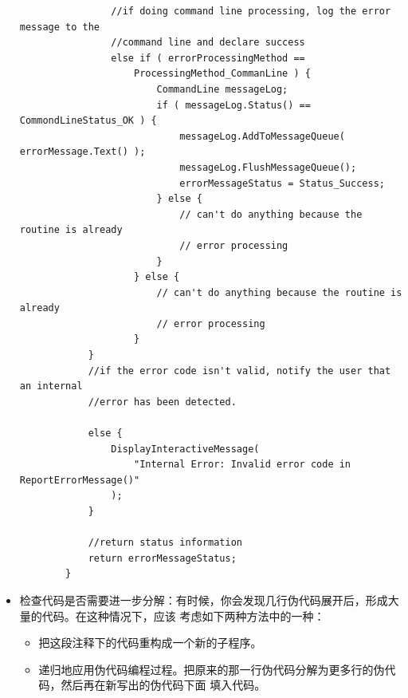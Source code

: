 \documentclass{article}
\begin{document}
\begin{itemize}
\begin{lstlisting}
                //if doing command line processing, log the error message to the 
                //command line and declare success
                else if ( errorProcessingMethod ==
                    ProcessingMethod_CommanLine ) {
                        CommandLine messageLog;
                        if ( messageLog.Status() == CommondLineStatus_OK ) {
                            messageLog.AddToMessageQueue( errorMessage.Text() );
                            messageLog.FlushMessageQueue();
                            errorMessageStatus = Status_Success;
                        } else {
                            // can't do anything because the routine is already
                            // error processing
                        }
                    } else {
                        // can't do anything because the routine is already
                        // error processing
                    }
            }
            //if the error code isn't valid, notify the user that an internal 
            //error has been detected.

            else {
                DisplayInteractiveMessage(
                    "Internal Error: Invalid error code in ReportErrorMessage()"
                );
            }

            //return status information
            return errorMessageStatus;
        }
    \end{lstlisting}
    \item 检查代码是否需要进一步分解：有时候，你会发现几行伪代码展开后，形成大量的代码。在这种情况下，应该
    考虑如下两种方法中的一种：
    \begin{itemize}
        \item 把这段注释下的代码重构成一个新的子程序。
        \item 递归地应用伪代码编程过程。把原来的那一行伪代码分解为更多行的伪代码，然后再在新写出的伪代码下面
        填入代码。
    \end{itemize}
\end{itemize}
\end{document}
